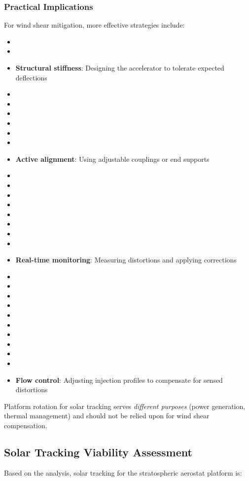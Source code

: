 {{{{\subsubsection{Practical Implications}
For wind shear mitigation, more effective strategies include:
\begin{itemize}
    \item \item \item \textbf{Structural stiffness}: Designing the accelerator to tolerate expected deflections
    \item \item \item \item \item \item \item \textbf{Active alignment}: Using adjustable couplings or end supports
    \item \item \item \item \item \item \item \item \item \textbf{Real-time monitoring}: Measuring distortions and applying corrections
    \item \item \item \item \item \item \item \item \item \item \item \textbf{Flow control}: Adjusting injection profiles to compensate for sensed distortions
\end{itemize}
Platform rotation for solar tracking serves \emph{different purposes} (power generation, thermal management) and should not be relied upon for wind shear compensation.

\subsection{Solar Tracking Viability Assessment}
Based on the analysis, solar tracking for the stratospheric aerostat platform is:

}}}}

